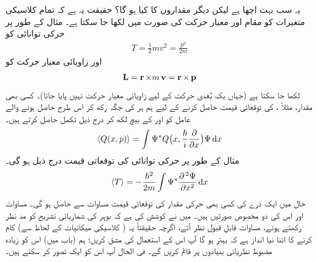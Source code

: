 یہ سب بہت اچھا ہے لیکن دیگر مقداروں کا کیا ہو گا؟ حقیقت یہ ہے کہ تمام کلاسیکی متغیرات کو مقام اور معیار حرکت کی صورت میں لکھا جا سکتا ہے۔ مثال کے طور پر حرکی توانائی کو
\begin{align*}
T=\frac{1}{2}mv^{2}=\frac{p^{2}}{2m}
\end{align*}
اور زاویائی معیار حرکت کو 
\begin{align*}
\operatorname{\mathbf{L}}=\operatorname{\mathbf{r}}\times m\operatorname{\mathbf{v}}=\operatorname{\mathbf{r}}\times \operatorname{\mathbf{p}}
\end{align*}
لکھا جا سکتا ہے (جہاں یک بُعدی حرکت کے لیے زاویائی معیار حرکت نہیں پایا جاتا)۔ کسی بھی مقدار، مثلاً ، کی توقعاتی قیمت حاصل کرنے کے لیے ہم ہر  کی جگہ   رکھ کر  اس طرح  حاصل ہونے والے  عامل کو  اور  کے بیچ لکھ کر درج ذیل تکمل حاصل کرتے ہیں۔
\begin{align}\label{مساوات_تفاعل_موج_توقعاتی_قیمت_حصول}
\langle Q(x,p) \rangle=\int \Psi^*Q\big (x,\frac{\hslash}{i}\frac{\partial}{\partial{x}}\big )\Psi \dif{x}
\end{align}
مثال کے طور پر حرکی توانائی کی توقعاتی قیمت درج ذیل ہو گی۔
\begin{align}
\langle T \rangle=-\frac{\hslash ^{2}}{2m}\int \Psi^*\frac{\partial^{\,2}\Psi}{\partial{x^{2}}}\dif{x}
\end{align}
حال  میں ایک ذرے کی کسی بھی حرکی مقدار کی توقعاتی قیمت مساوات   سے حاصل ہو گی۔ 
مساوات  اور  اس کی دو مخصوص صورتیں ہیں۔ میں نے کوشش کی ہے کہ بوہر کی شماریاتی تشریح کو مد نظر رکھتے ہوئے، مساوات  قابلِ  قبول نظر آئے، اگرچہ حقیقتاً یہ ( کلاسیکی میکانیات کے لحاظ سے) کام کرنے کا اتنا نیا انداز ہے کہ بہتر ہو گا آپ اس کے استعمال کی مشق کریں؛ ہم (باب  میں) اس کو زیادہ مضبوط نظریاتی بنیادوں پر قائم کریں گے۔ فی الحال آپ اس کو ایک  تصور کر سکتے ہیں۔


